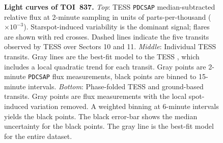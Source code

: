 \documentclass[12pt,twocolumn,tighten]{aastex63}
\newcommand{\tn}{TOI~837} %
\begin{document}
\begin{figure}[!t]
	\begin{center}
		\leavevmode
		
		\vspace{-0.5cm}
	\end{center}
	\vspace{-0.6cm}
	\caption{
    {\bf Light curves of \tn.}
    {\it Top}:
    TESS \texttt{PDCSAP} median-subtracted relative flux at 2-minute
    sampling in units of parts-per-thousand ($\times 10^{-3}$).
    Starspot-induced variability is the dominant signal; flares are
    shown with red crosses.  Dashed lines indicate the five transits
    observed by TESS over Sectors 10 and 11.  {\it Middle}: Individual
    TESS transits.  Gray lines are the best-fit model to the TESS
    , which includes a local quadratic
    trend for each transit. Gray points are 2-minute \texttt{PDCSAP}
    flux measurements, black points are binned to 15-minute intervals.
    {\it Bottom}: Phase-folded TESS and ground-based transits.
     Gray points are flux measurements with the local
    spot-induced variation removed.  A weighted binning at 6-minute
    intervals yields the black points.  The black error-bar shows the
    median uncertainty for the black points.  The gray line is the
    best-fit model for the entire dataset.
		\label{fig:thephot}
	}
\end{figure}
\end{document}
